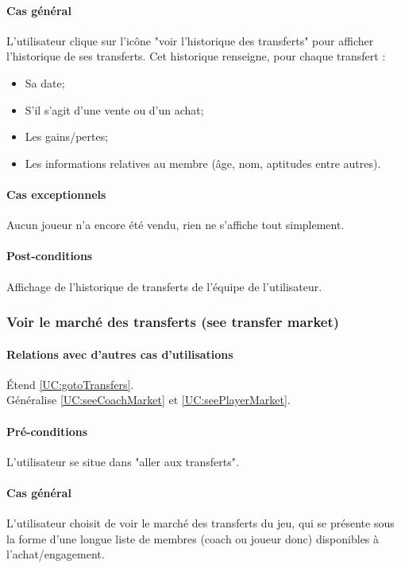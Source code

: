 \paragraph{Cas général}
L'utilisateur clique sur l'icône "voir l'historique des transferts" pour afficher l'historique de ses transferts. Cet historique renseigne, pour chaque transfert :
\begin{itemize}
\item{Sa date;}
\item{S'il s'agit d'une vente ou d'un achat;}
\item{Les gains/pertes;}
\item{Les informations relatives au membre (âge, nom, aptitudes entre autres).}
\end{itemize}
\paragraph{Cas exceptionnels}
Aucun joueur n'a encore été vendu, rien ne s'affiche tout simplement. 
\paragraph{Post-conditions}
\begin{list}{}{\leftmargin=1.5em}
\item{Affichage de l'historique de transferts de l'équipe de l'utilisateur.}
\end{list}

\subsubsection{Voir le marché des transferts (see transfer market)}
\label{UC:seeMarket}
\paragraph{Relations avec d'autres cas d'utilisations}
Étend \ref{UC:gotoTransfers}.\\
Généralise \ref{UC:seeCoachMarket} et \ref{UC:seePlayerMarket}.
\paragraph{Pré-conditions}
\begin{list}{}{\leftmargin=1.5em}
\item{L'utilisateur se situe dans "aller aux transferts"}.
\end{list}
\paragraph{Cas général}
L'utilisateur choisit de voir le marché des transferts du jeu, qui se présente sous la forme d'une longue liste de membres (coach ou joueur donc) disponibles à l'achat/engagement.
